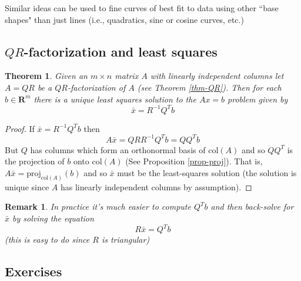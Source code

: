 \documentclass[12pt]{article}
\numberwithin{equation}{subsection}
\numberwithin{figure}{subsection}
\newtheorem{thm}[subsection]{Theorem}
\theoremstyle{note}
\newtheorem{remark}[subsection]{Remark}
\newcommand{\R}{\mathbf{R}}
\newcommand\col[1]{\mathrm{col}(#1)}
\newcommand\proj[2]{\mathrm{proj}_{#1}(#2)}
\begin{document}
Similar ideas can be used to fine curves of best fit to data using other ``base shapes" than just lines (i.e., quadratics, sine or cosine curves, etc.)

\subsection{$QR$-factorization and least squares}

\begin{thm}Given an $m\times n$ matrix $A$ with linearly independent columns let $A=QR$ be a $QR$-factorization of $A$ (see Theorem \ref{thm-QR}). Then for each $b\in \R^m$ there is a unique least squares solution to the $Ax=b$ problem given by \begin{equation} \bar{x}=R^{-1}Q^Tb\end{equation}
\end{thm}

\begin{proof}
	If $\bar{x}=R^{-1}Q^Tb$ then \[ A\bar{x}=QRR^{-1}Q^Tb=QQ^Tb\] But $Q$ has columns which form an orthonormal basis of $\col{A}$ and so $QQ^T$ is the projection of $b$ onto $\col{A}$ (See Proposition \ref{prop-proj}). That is, $A\bar{x}=\proj{\col{A}}{b}$ and so $\bar{x}$ must be the least-squares solution (the solution is unique since $A$ has linearly independent columns by assumption). 
\end{proof}

\begin{remark}
In practice it's much easier to compute $Q^Tb$ and then back-solve for $\bar{x}$ by solving the equation \[ R\bar{x}=Q^Tb\] 
(this is easy to do since $R$ is triangular)
\end{remark}
\subsection{Exercises}
\end{document}
